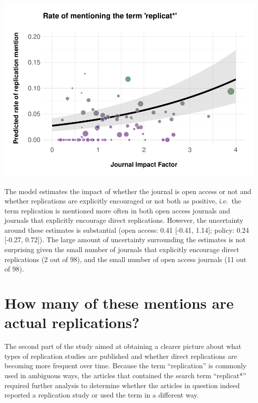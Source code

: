 \documentclass[]{elsarticle} %
\begin{document}
\begin{center}\includegraphics[width=1\linewidth]{ReplicationLing_files/figure-latex/plot_mention_jif-1} \end{center}

The model estimates the impact of whether the journal is open access or
not and whether replications are explicitly encouraged or not both as
positive, i.e.~the term replication is mentioned more often in both open
access journals and journals that explicitly encourage direct
replications. However, the uncertainty around these estimates is
substantial (open access: 0.41 {[}-0.41, 1.14{]}; policy: 0.24 {[}-0.27,
0.72{]}). The large amount of uncertainty surrounding the estimates is
not surprising given the small number of journals that explicitly
encourage direct replications (2 out of 98), and the small number of
open access journals (11 out of 98).

\hypertarget{how-many-of-these-mentions-are-actual-replications}{%
\section{How many of these mentions are actual
replications?}\label{how-many-of-these-mentions-are-actual-replications}}

The second part of the study aimed at obtaining a clearer picture about
what types of replication studies are published and whether direct
replications are becoming more frequent over time. Because the term
``replication'' is commonly used in ambiguous ways, the articles that
contained the search term ``replicat*'' required further analysis to
determine whether the articles in question indeed reported a replication
study or used the term in a different way.
\end{document}
